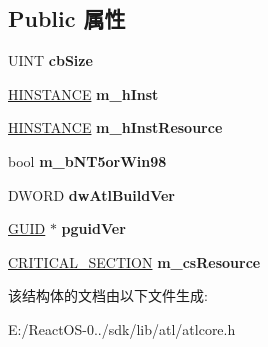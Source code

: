 \subsection*{Public 属性}
\begin{DoxyCompactItemize}
\item 
\mbox{\label{struct_a_t_l_1_1___a_t_l___b_a_s_e___m_o_d_u_l_e70_a69bd1f4823a444fa9ec7db7491f32801}} 
U\+I\+NT {\bfseries cb\+Size}
\item 
\mbox{\label{struct_a_t_l_1_1___a_t_l___b_a_s_e___m_o_d_u_l_e70_a5e26f755dd500351d7a6651234f6f51f}} 
\hyperlink{interfacevoid}{H\+I\+N\+S\+T\+A\+N\+CE} {\bfseries m\+\_\+h\+Inst}
\item 
\mbox{\label{struct_a_t_l_1_1___a_t_l___b_a_s_e___m_o_d_u_l_e70_ae26fb79c3a669d3dc2c2d5b6d715246f}} 
\hyperlink{interfacevoid}{H\+I\+N\+S\+T\+A\+N\+CE} {\bfseries m\+\_\+h\+Inst\+Resource}
\item 
\mbox{\label{struct_a_t_l_1_1___a_t_l___b_a_s_e___m_o_d_u_l_e70_a4547f73a50510f7d4ad37c2027f164ad}} 
bool {\bfseries m\+\_\+b\+N\+T5or\+Win98}
\item 
\mbox{\label{struct_a_t_l_1_1___a_t_l___b_a_s_e___m_o_d_u_l_e70_ac2f01a467529499bc06e1cb7f2975240}} 
D\+W\+O\+RD {\bfseries dw\+Atl\+Build\+Ver}
\item 
\mbox{\label{struct_a_t_l_1_1___a_t_l___b_a_s_e___m_o_d_u_l_e70_adf2e6272b0e4ed64079ebc4bbbb61b57}} 
\hyperlink{interface_g_u_i_d}{G\+U\+ID} $\ast$ {\bfseries pguid\+Ver}
\item 
\mbox{\label{struct_a_t_l_1_1___a_t_l___b_a_s_e___m_o_d_u_l_e70_ad229f3eff783a27727553577ac984362}} 
\hyperlink{struct___c_r_i_t_i_c_a_l___s_e_c_t_i_o_n}{C\+R\+I\+T\+I\+C\+A\+L\+\_\+\+S\+E\+C\+T\+I\+ON} {\bfseries m\+\_\+cs\+Resource}
\end{DoxyCompactItemize}


该结构体的文档由以下文件生成\+:\begin{DoxyCompactItemize}
\item 
E\+:/\+React\+O\+S-\/0../sdk/lib/atl/atlcore.\+h\end{DoxyCompactItemize}
